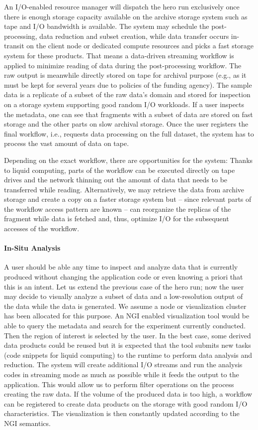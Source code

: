 \documentclass[a4paper, twocolumn]{article}
\begin{document}
An I/O-enabled resource manager will dispatch the hero run exclusively once there is enough storage capacity available on the archive storage system such as tape and I/O bandwidth is available.
The system may schedule the post-processing, data reduction and subset creation, while  data transfer occurs in-transit on the client node or dedicated compute resources and picks a fast storage system for these products.
That means a data-driven streaming workflow is applied to minimize reading of data during the post-processing workflow.
The raw output is meanwhile directly stored on tape for archival purpose (e.g., as it must be kept for several years due to policies of the funding agency).
The sample data is a replicate of a subset of the raw data's domain and stored for inspection on a storage system supporting good random I/O workloads.
If a user inspects the metadata, one can see that fragments with a subset of data are stored on fast storage and the other parts on slow archival storage.
Once the user registers the final workflow, i.e., requests data processing on the full dataset, the system has to process the vast amount of data on tape.

Depending on the exact workflow, there are opportunities for the system:
Thanks to liquid computing, parts of the workflow can be executed directly on tape drives and the network thinning out the amount of data that needs to be transferred while reading.
Alternatively, we may retrieve the data from archive storage and create a copy on a faster storage system but -- since relevant parts of the workflow access pattern are known -- can reorganize the replicas of the fragment while data is fetched and, thus, optimize I/O for the subsequent accesses of the workflow.


\paragraph{In-Situ Analysis}

A user should be able any time to inspect and analyze data that is currently produced without changing the application code or even knowing a priori that this is an intent.
Let us extend the previous case of the hero run; now the user may decide to visually analyze a subset of data and a low-resolution output of the data while the data is generated.
We assume a node or visualization cluster has been allocated for this purpose.
An NGI enabled visualization tool would be able to query the metadata and search for the experiment currently conducted.
Then the region of interest is selected by the user.
In the best case, some derived data products could be reused but it is expected that the tool submits new tasks (code snippets for liquid computing) to the runtime to perform data analysis and reduction.
The system will create additional I/O streams and run the analysis codes in streaming mode as much as possible while it feeds the output to the application.
This would allow us to perform filter operations on the process creating the raw data.
If the volume of the produced data is too high, a workflow can be registered to create data products on the storage with good random I/O characteristics.
The visualization is then constantly updated according to the NGI semantics.
\end{document}
